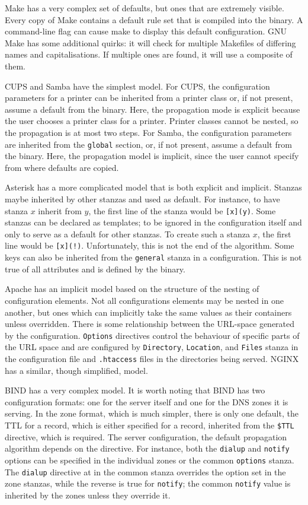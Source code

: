 \documentclass[letterpaper,twocolumn,10pt]{article}
\begin{document}
Make has a very complex set of defaults, but ones that are extremely visible. Every copy of Make contains a default rule set that is compiled into the binary. A command-line flag can cause make to display this default configuration. GNU Make has some additional quirks: it will check for multiple Makefiles of differing names and capitalisations. If multiple ones are found, it will use a composite of them.\cite{make}

CUPS and Samba have the simplest model. For CUPS, the configuration parameters for a printer can be inherited from a printer class or, if not present, assume a default from the binary.\cite{cups} Here, the propagation mode is explicit because the user chooses a printer class for a printer. Printer classes cannot be nested, so the propagation is at most two steps. For Samba, the configuration parameters are inherited from the \texttt{global} section, or, if not present, assume a default from the binary.\cite{samba} Here, the propagation model is implicit, since the user cannot specify from where defaults are copied.

Asterisk has a more complicated model that is both explicit and implicit. Stanzas maybe inherited by other stanzas and used as default. For instance, to have stanza $x$ inherit from $y$, the first line of the stanza would be \verb![x](y)!. Some stanzas can be declared as templates; to be ignored in the configuration itself and only to serve as a default for other stanzas. To create such a stanza $x$, the first line would be \verb#[x](!)#. Unfortunately, this is not the end of the algorithm. Some keys can also be inherited from the \texttt{general} stanza in a configuration. This is not true of all attributes and is defined by the binary.

Apache has an implicit model based on the structure of the nesting of configuration elements. Not all configurations elements may be nested in one another, but ones which can implicitly take the same values as their containers unless overridden. There is some relationship between the URL-space generated by the configuration. \texttt{Options} directives control the behaviour of specific parts of the URL space and are configured by \texttt{Directory}, \texttt{Location}, and \texttt{Files} stanza in the configuration file and \verb!.htaccess! files in the directories being served.\cite{apache} NGINX has a similar, though simplified, model.\cite{nginx}

BIND has a very complex model. It is worth noting that BIND has two configuration formats: one for the server itself and one for the DNS zones it is serving. In the zone format, which is much simpler, there is only one default, the TTL for a record, which is either specified for a record, inherited from the \texttt{\$TTL} directive, which is required. The server configuration, the default propagation algorithm depends on the directive. For instance, both the \texttt{dialup}  and \texttt{notify} options can be specified in the individual zones or the common \texttt{options} stanza. The \texttt{dialup} directive at in the common stanza overrides the option set in the zone stanzas, while the reverse is true for \texttt{notify}; the common \texttt{notify} value is inherited by the zones unless they override it.\cite{bind}
\end{document}
